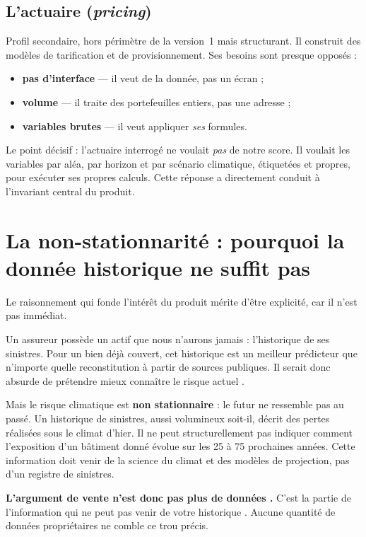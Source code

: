 \subsection{L'actuaire (\emph{pricing})}

Profil secondaire, hors périmètre de la version~1 mais structurant. Il
construit des modèles de tarification et de provisionnement. Ses besoins sont
presque opposés :

\begin{itemize}[leftmargin=1.4em]
  \item \textbf{pas d'interface} — il veut de la donnée, pas un écran ;
  \item \textbf{volume} — il traite des portefeuilles entiers, pas une adresse ;
  \item \textbf{variables brutes} — il veut appliquer \emph{ses} formules.
\end{itemize}

Le point décisif : l'actuaire interrogé ne voulait \emph{pas} de notre score.
Il voulait les variables par aléa, par horizon et par scénario climatique,
étiquetées et propres, pour exécuter ses propres calculs. Cette réponse a
directement conduit à l'invariant central du produit.

\section{La non-stationnarité : pourquoi la donnée historique ne suffit pas}

Le raisonnement qui fonde l'intérêt du produit mérite d'être explicité, car il
n'est pas immédiat.

Un assureur possède un actif que nous n'aurons jamais : l'historique de ses
sinistres. Pour un bien déjà couvert, cet historique est un meilleur prédicteur
que n'importe quelle reconstitution à partir de sources publiques. Il serait
donc absurde de prétendre \og mieux connaître le risque actuel \fg.

Mais le risque climatique est \textbf{non stationnaire} : le futur ne ressemble
pas au passé. Un historique de sinistres, aussi volumineux soit-il, décrit des
pertes réalisées sous le climat d'hier. Il ne peut structurellement pas
indiquer comment l'exposition d'un bâtiment donné évolue sur les 25 à 75
prochaines années. Cette information doit venir de la science du climat et des
modèles de projection, pas d'un registre de sinistres.

\begin{encadre}
\textbf{L'argument de vente n'est donc pas \og plus de données \fg.} C'est \og
la partie de l'information qui ne peut pas venir de votre historique \fg.
Aucune quantité de données propriétaires ne comble ce trou précis.
\end{encadre}

